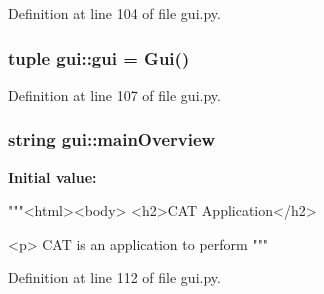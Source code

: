 Definition at line 104 of file gui.py.\hypertarget{namespacegui_acd337aaaca9f720eb72e04156537088f}{
\subsubsection[{gui}]{\setlength{\rightskip}{0pt plus 5cm}tuple {\bf gui::gui} = {\bf Gui}()}}
\label{namespacegui_acd337aaaca9f720eb72e04156537088f}


Definition at line 107 of file gui.py.\hypertarget{namespacegui_a84cfd37f1e5cd972a2d03313f9b75628}{
\subsubsection[{mainOverview}]{\setlength{\rightskip}{0pt plus 5cm}string {\bf gui::mainOverview}}}
\label{namespacegui_a84cfd37f1e5cd972a2d03313f9b75628}
{\bfseries Initial value:}
\begin{DoxyCode}
"""<html><body>
<h2>CAT Application</h2>

<p> CAT is an application to perform
"""
\end{DoxyCode}


Definition at line 112 of file gui.py.